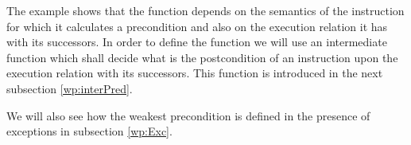 The example shows that the function \fwpi{} depends  on the semantics of the instruction 
for which it calculates a precondition and also on the execution relation it has with its successors.
In order to define the function \fwpi{} we will use an intermediate function which shall decide 
what is the postcondition of an instruction  upon the execution relation with its successors. This function 
is introduced in the next subsection \ref{wp:interPred}.
 
We will also see how the weakest precondition is defined in the presence of exceptions in subsection \ref{wp:Exc}.



